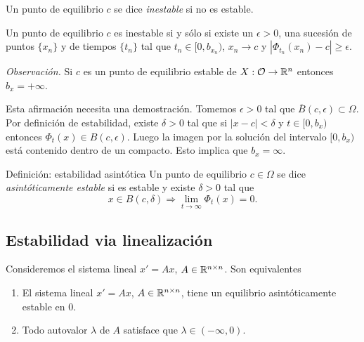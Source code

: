   


\begin{definicion}{}
	      Un punto de equilibrio $c$ se dice \emph{inestable} si no es estable.
 \end{definicion}            

\begin{ejercicio}{} Un punto de equilibrio $c$ es inestable si y sólo si existe
               un $\epsilon>0$,  una sucesión  de puntos $\{x_n\}$ y de tiempos $\{t_n\}$ tal que $t_n\in [0,b_{x_n})$, 
		$x_n\to c$ y $|\Phi_{t_n}(x_n)-c|\geq \epsilon$.
	    
\end{ejercicio}



 \noindent\emph{Observación.} Si $c$  es un punto de equilibrio estable de $X:\mathcal{O}\to\mathbb{R}^n$ entonces $b_x=+\infty$.
 
Esta afirmación necesita una demostración. Tomemos $\epsilon>0$ tal que $\overline{B}(c,\epsilon)\subset\Omega$. 
Por definición de estabilidad, existe $\delta>0$ tal que si $|x-c|<\delta$ y $t\in[0,b_x)$ entonces
$\Phi_t(x)\in B(c,\epsilon)$. Luego la imagen por la solución del intervalo $[0,b_x)$ está contenido dentro
de un compacto. Esto implica que $b_x=\infty$. 
 

\begin{definicion}{}
 {Definición: estabilidad asintótica} Un punto de equilibrio $c\in\Omega$ se dice 
  \emph{asintóticamente estable} si es estable y existe $\delta>0$ tal que
  \[x\in B(c,\delta)\Rightarrow \lim_{t\to\infty}\Phi_t(x)=0.\]
  \end{definicion}  
 

 
 \subsection{Estabilidad via linealización}
 

\begin{teorema}{}
 Consideremos el sistema lineal $x'=Ax$, $A\in\mathbb{R}^{n\times n}$.  Son equivalentes
  \begin{enumerate}
   \item El sistema lineal $x'=Ax$, $A\in\mathbb{R}^{n\times n}$, tiene un equilibrio asintóticamente estable en $0$.
   \item Todo autovalor $\lambda$  de $A$ satisface que $\lambda\in (-\infty,0)$.
  \end{enumerate}
 
\end{teorema}

